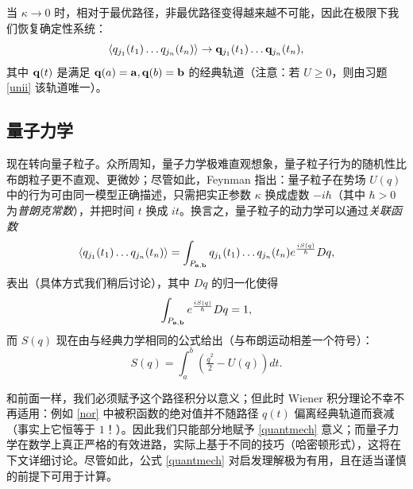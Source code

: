\begin{remark}\label{classlim} 当 $\kappa\to 0$ 时，相对于最优路径，非最优路径变得越来越不可能，因此在极限下我们恢复确定性系统：
$$
\langle q_{j_1}(t_1) \ldots q_{j_n}(t_n)\rangle\to \bold q_{j_1}(t_1) \ldots \bold q_{j_n}(t_n), 
$$
其中 $\bold q(t)$ 是满足 $\bold q(a)=\bold a,\bold q(b)=\bold b$ 的经典轨道（注意：若 $U\ge 0$，则由习题 \ref{unii} 该轨道唯一）。
\end{remark}

\subsection{量子力学}

现在转向量子粒子。众所周知，量子力学极难直观想象，量子粒子行为的随机性比布朗粒子更不直观、更微妙；尽管如此，Feynman 指出：量子粒子在势场 $U(q)$ 中的行为可由同一模型正确描述，只需把实正参数 $\kappa$ 换成虚数 $-i\hbar$（其中 $\hbar>0$ 为\emph{普朗克常数}），并把时间 $t$ 换成 $it$。换言之，量子粒子的动力学可以通过\emph{关联函数}
\begin{equation}\label{quantmech}
\langle q_{j_1}(t_1) \dots q_{j_n}(t_n)\rangle=
\int_{P_{\bold a,\bold b}} q_{j_1}(t_1) \ldots q_{j_n}(t_n)e^{\frac{iS(q)}{\hbar}}Dq, 
\end{equation}
表出（具体方式我们稍后讨论），其中 $Dq$ 的归一化使得
\begin{equation}\label{nor}
\int_{P_{\bold a,\bold b}} e^{\frac{iS(q)}{\hbar}}Dq=1,
\end{equation}
而 $S(q)$ 现在由与经典力学相同的公式给出（与布朗运动相差一个符号）：
$$
S(q)=\int_a^b (\tfrac{{\dot{q}}^2}{2}-U(q))dt.
$$

和前面一样，我们必须赋予这个路径积分以意义；但此时 Wiener 积分理论不幸不再适用：例如 \eqref{nor} 中被积函数的绝对值并不随路径 $q(t)$ 偏离经典轨道而衰减（事实上它恒等于 $1$！）。因此我们只能部分地赋予 \eqref{quantmech} 意义；而量子力学在数学上真正严格的有效进路，实际上基于不同的技巧（哈密顿形式），这将在下文详细讨论。尽管如此，公式 \eqref{quantmech} 对启发理解极为有用，且在适当谨慎的前提下可用于计算。


